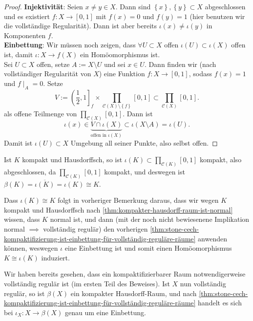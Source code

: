\begin{proof}
    \textbf{Injektivität}: Seien $x\neq y\in X$. Dann sind $\left \{x\right\} ,\left \{y\right\} \subset X$ abgeschlossen und es existiert $f: X \to  [0,1]$ mit $f(x) = 0$ und  $f(y) = 1$ (hier benutzen wir die vollständige Regularität). Dann ist aber bereits  $ι(x) \neq  ι(y)$ in Komponenten $f$. \\
    \textbf{Einbettung}: Wir müssen noch zeigen, dass $\forall  U\subset X$ offen $ι(U) \subset ι(X)$ offen ist, damit $ι : X \to  f(X)$ ein Homöomorphismus ist. \\
    Sei $U\subset X$ offen, setze $A := X\setminus U$ und sei $x\in U$. Dann finden wir (nach vollständiger Regularität von $X$) eine Funktion  $f: X \to  [0,1]$, sodass $f(x) = 1$ und  $f\mid _{A} = 0$. Setze
    \[
        V := \left( \frac{1}{2},1 \right]_f \times \prod_{\mathcal{C}(X) \setminus \left \{f\right\} } [0,1] \subset \prod_{\mathcal{C}(X)} [0,1]
    .\] 
    als offene Teilmenge von $\prod_{\mathcal{C}(X)} [0,1]$. Dann ist
    \[
        ι(x) \in \underbrace{V \cap  ι(X)}_{\text{offen in } ι(X)} \subset ι(X \setminus A) = ι(U)
    .\] 
    Damit ist $ι(U)\subset X$ Umgebung all seiner Punkte, also selbst offen.
\end{proof}
\begin{remark}
    Ist $K$ kompakt und Hausdorffsch, so ist  $ι(K) \subset \prod_{\mathcal{C}(K)} [0,1]$ kompakt, also abgeschlossen, da $\prod_{\mathcal{C}(K)} [0,1]$ kompakt, und deswegen ist $β(K) = \overline{ι(K)} = ι(K) \cong K$.
\end{remark}
\begin{remark*}
    Dass $ι(K) \cong K$ folgt in vorheriger Bemerkung daraus, dass wir wegen  $K$ kompakt und Hausdorffsch nach \autoref{thm:kompakter-hausdorff-raum-ist-normal} wissen, dass $K$ normal ist, und dann (mit der noch nicht bewiesenene Implikation normal  $\implies$ vollständig regulär) den vorherigen \autoref{thm:stone-cech-kompaktifizierung-ist-einbettung-für-vollständig-reguläre-räume} anwenden können, weswegen $ι$ eine Einbettung ist und somit einen Homöomorphismus  $K \cong ι(K)$ induziert.
\end{remark*}
\begin{proof*}
    Wir haben bereits gesehen, dass ein kompaktifizierbarer Raum notwendigerweise vollständig regulär ist (im ersten Teil des Beweises). Ist $X$ nun vollständig regulär, so ist  $β(X)$ ein kompakter Hausdorff-Raum, und nach \autoref{thm:stone-cech-kompaktifizierung-ist-einbettung-für-vollständig-reguläre-räume} handelt es sich bei $ι_X : X \to  β(X)$ genau um eine Einbettung.
\end{proof*}
